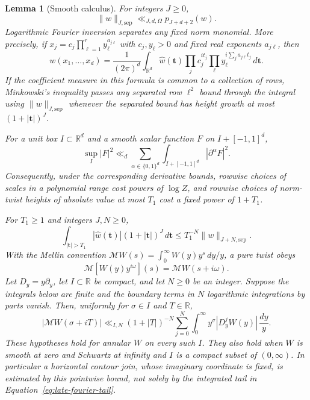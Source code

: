 \documentclass[11pt,a4paper]{article}
\numberwithin{equation}{section}
\numberwithin{figure}{section}
\newtheorem{lemma}[theorem]{Lemma}
\theoremstyle{definition}
\theoremstyle{remark}
\begin{document}
\begin{lemma}[Smooth calculus]\label{lem:smooth-calculus}
For integers $J\ge0$,
\[
 \|w\|_{J,\mathrm{sep}}\ll_{J,d,\Omega}p_{J+d+2}(w).
\]
Logarithmic Fourier inversion separates any fixed norm monomial.  More
precisely, if $x_j=c_j\prod_{\ell=1}^r y_\ell^{a_{j\ell}}$ with $c_j,y_\ell>0$
and fixed real exponents $a_{j\ell}$, then
\[
 w(x_1,\ldots,x_d)=\frac1{(2\pi)^d}\int_{\mathbb R^d}
 \widehat w(\boldsymbol t)\prod_j c_j^{it_j}
       \prod_\ell y_\ell^{i\sum_j a_{j\ell}t_j}\,d\boldsymbol t.
\]
If the coefficient measure in this formula is common to a collection of
rows, Minkowski's inequality passes any separated row $\ell^2$ bound through
the integral using $\|w\|_{J,\mathrm{sep}}$ whenever the separated bound has
height growth at most $(1+|\boldsymbol t|)^J$.

For a unit box $I\subset\mathbb R^d$ and a smooth scalar function $F$ on
$I+[-1,1]^d$,
\begin{equation}\label{eq:parameter-sobolev}
 \sup_I|F|^2\ll_d
 \sum_{\alpha\in\{0,1\}^d}
 \int_{I+[-1,1]^d}|\partial^\alpha F|^2.
\end{equation}
Consequently, under the corresponding derivative bounds, rowwise choices
of scales in a polynomial range cost powers of $\log Z$, and rowwise choices
of norm-twist heights of absolute value at most $T_1$ cost a fixed power of
$1+T_1$.

For $T_1\ge1$ and integers $J,N\ge0$,
\begin{equation}\label{eq:late-fourier-tail}
 \int_{|\boldsymbol t|>T_1}|\widehat w(\boldsymbol t)|
             (1+|\boldsymbol t|)^J\,d\boldsymbol t
 \le T_1^{-N}\|w\|_{J+N,\mathrm{sep}}.
\end{equation}
With the Mellin convention
$\mathcal MW(s)=\int_0^\infty W(y)y^s\,dy/y$, a pure twist obeys
\[
 \mathcal M[W(y)y^{i\omega}](s)=\mathcal MW(s+i\omega).
\]
Let $D_y=y\partial_y$, let $I\subset\mathbb R$ be compact, and let $N\ge0$
be an integer.  Suppose the integrals below are finite and the boundary terms
in $N$ logarithmic integrations by parts vanish.  Then, uniformly for
$\sigma\in I$ and $T\in\mathbb R$,
\begin{equation}\label{eq:pointwise-mellin-tail}
 |\mathcal MW(\sigma+iT)|
 \ll_{I,N}(1+|T|)^{-N}
     \sum_{j=0}^N\int_0^\infty y^\sigma|D_y^jW(y)|\,\frac{dy}{y}.
\end{equation}
These hypotheses hold for annular $W$ on every such $I$.  They also hold
when $W$ is smooth at zero and Schwartz at infinity and $I$ is a compact
subset of $(0,\infty)$.  In particular a horizontal contour join, whose
imaginary coordinate is fixed, is estimated by this pointwise bound, not
solely by the integrated tail in Equation~\eqref{eq:late-fourier-tail}.


\end{lemma}
\end{document}
